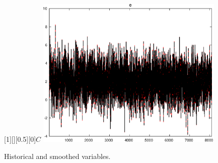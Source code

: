  
\begin{figure}[H]
[1][][0.5][0]{$ {C} $}
\centering 
\includegraphics[width=0.80\textwidth]{KimModTheBuilder_HistoricalAndSmoothedVariables1}
\caption{Historical and smoothed variables.}\label{Fig:HistoricalAndSmoothedVariables:1}
\end{figure}



